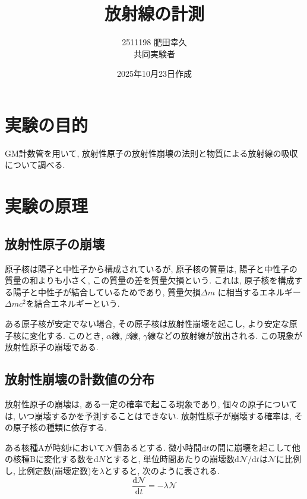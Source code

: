 \documentclass{jarticle}
\title{放射線の計測}
\author{2511198 肥田幸久 \\ 共同実験者 \\ }
\date{2025年10月23日作成}
\begin{document}
\maketitle



\section{実験の目的}

GM計数管を用いて, 放射性原子の放射性崩壊の法則と物質による放射線の吸収について調べる.



\section{実験の原理}


\subsection{放射性原子の崩壊}

原子核は陽子と中性子から構成されているが, 原子核の質量は, 陽子と中性子の質量の和よりも小さく, この質量の差を質量欠損という.
これは, 原子核を構成する陽子と中性子が結合しているためであり, 質量欠損$\Delta m$ に相当するエネルギー$\Delta mc^2$を結合エネルギーという.

ある原子核が安定でない場合, その原子核は放射性崩壊を起こし, より安定な原子核に変化する.
このとき, $\alpha$線, $\beta$線, $\gamma$線などの放射線が放出される.
この現象が放射性原子の崩壊である.


\subsection{放射性崩壊の計数値の分布}

放射性原子の崩壊は, ある一定の確率で起こる現象であり, 個々の原子については, いつ崩壊するかを予測することはできない.
放射性原子が崩壊する確率は, その原子核の種類に依存する.

ある核種$\mathrm{A}$が時刻$t$において$\mathcal{N}$個あるとする.
微小時間$\mathrm{d}t$の間に崩壊を起こして他の核種$\mathrm{B}$に変化する数を$\mathrm{d}N$とすると, 単位時間あたりの崩壊数$\mathrm{d}\mathcal{N}/\mathrm{d}t$は$\mathcal{N}$に比例し, 比例定数(崩壊定数)を$\lambda$とすると, 次のように表される.
\begin{equation}
  \frac{\mathrm{d}\mathcal{N}}{\mathrm{d}t} = -\lambda \mathcal{N}
\end{equation}
\end{document}
